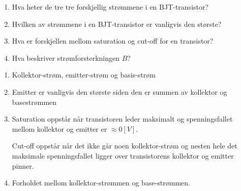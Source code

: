 \begin{question}[name=Oppgave, topic=transBJT]
	\begin{enumerate}[label=\roman*)]
		\item Hva heter de tre tre forskjellig strømmene i en BJT-transistor?
		\item Hvilken av strømmene i en BJT-transistor er vanligvis den største?
		\item Hva er forskjellen mellom saturation og cut-off for en transistor?
		\item Hva beskriver strømforsterkningen $B$?
	\end{enumerate}

\end{question}

\vspace{0.5cm} %

\begin{solution}[name=Løsningsforslag oppgave]
		\begin{enumerate}[label=\roman*)]
		\item Kollektor-strøm, emitter-strøm og basis-strøm
		\item Emitter er vanligvis den største siden den er summen av kollektor og basestrømmen
		\item Saturation oppstår når transistoren leder maksimalt og spenningsfallet mellom kollektor og emitter er $\approx 0 [V]$.
		
		Cut-off oppstår når det ikke går noen kollektor-strøm og nesten hele det maksimale spenningsfallet ligger over transistorens kollektor og emitter pinner.
		\item Forholdet mellom kollektor-strømmen og base-strømmen.
	\end{enumerate}

\end{solution}

